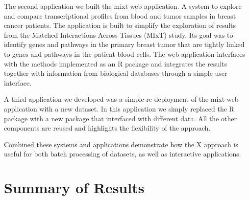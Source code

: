 The second application we built the \gls{mixt} web application. A system to
explore and compare transcriptional profiles from blood and tumor samples in
breast cancer patients. The application is built to simplify the exploration of
results from the Matched Interactions Across Tissues (MIxT) study. Its goal was
to identify genes and pathways in the primary breast tumor that are tightly
linked to genes and pathways in the patient blood
cells.\cite{dumeaux2017interactions} The web application interfaces with the
methods implemented as an R package and integrates the results together with
information from biological databases through a simple user interface. 

A third application we developed was a simple re-deployment of the \gls{mixt}
web application with a new dataset. In this application we simply replaced the R
package with a new package that interfaced with different data. All the other
components are reused and highlights the flexibility of the approach. 

Combined these systems and applications demonstrate how the X approach is useful
for both batch processing of datasets, as well as interactive applications. 



\section{Summary of Results} 


